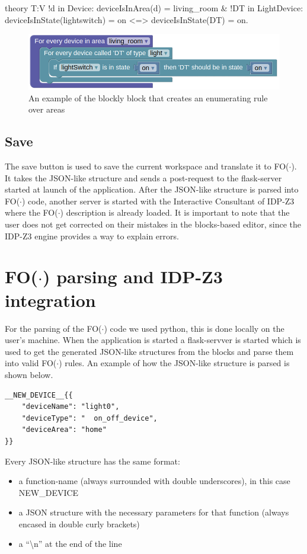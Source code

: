 \documentclass[11pt,a4paper]{report}
\newcommand{\fodot}{FO($\cdot$)\xspace}
\begin{document}
\begin{idplisting}
theory T:V {
    !d in Device: deviceIsInArea(d) = living_room & !DT in LightDevice: deviceIsInState(lightswitch) = on <=> deviceIsInState(DT) = on.
}
\end{idplisting}

\begin{figure}
    \centering
    \includegraphics[width=0.8\linewidth]{images/homy_enumerate_rule_area.png}
    \caption{An example of the blockly block that creates an enumerating rule over areas}
    \label{fig:homy_enumerate_rule_area}
\end{figure}

\subsection{Save}
The save button is used to save the current workspace and translate it to \fodot. It takes the JSON-like structure and sends a post-request to the flask-server started at launch of the application. After the JSON-like structure is parsed into \fodot code, another server is started with the Interactive Consultant of IDP-Z3 where the \fodot description is already loaded. It is important to note that the user does not get corrected on their mistakes in the blocks-based editor, since the IDP-Z3 engine provides a way to explain errors.

\section{\fodot parsing and IDP-Z3 integration}
For the parsing of the \fodot code we used python, this is done locally on the user's machine. When the application is started a flask-servver is started which is used to get the generated JSON-like structures from the blocks and parse them into valid \fodot rules.
An example of how the JSON-like structure is parsed is shown below.
\begin{verbatim}
__NEW_DEVICE__{{
    "deviceName": "light0", 
    "deviceType": "  on_off_device", 
    "deviceArea": "home"
}}
\end{verbatim}
Every JSON-like structure has the same format:
\begin{itemize}
    \item a function-name (always surrounded with double underscores), in this case NEW\_DEVICE
    \item a JSON structure with the necessary parameters for that function (always encased in double curly brackets)
    \item a ``\textbackslash n'' at the end of the line
\end{itemize}
\end{document}
